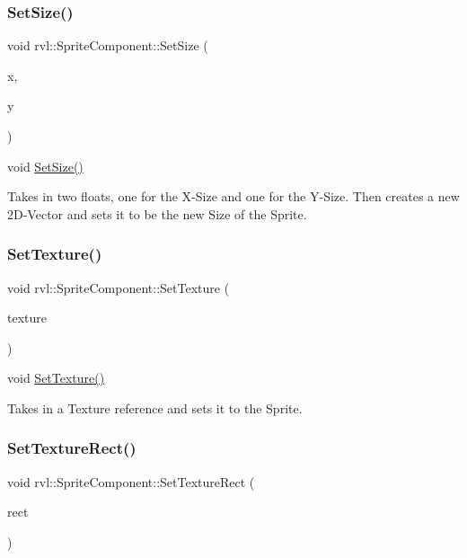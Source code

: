 \subsubsection{\texorpdfstring{Set\+Size()}{SetSize()}}
{\footnotesize\ttfamily void rvl\+::\+Sprite\+Component\+::\+Set\+Size (\begin{DoxyParamCaption}\item[{float}]{x,  }\item[{float}]{y }\end{DoxyParamCaption})}



void \hyperlink{classrvl_1_1_sprite_component_a615e08757168a43c867145c2021949b6}{Set\+Size()} 

Takes in two floats, one for the X-\/\+Size and one for the Y-\/\+Size. Then creates a new 2\+D-\/\+Vector and sets it to be the new Size of the Sprite. \mbox{\label{classrvl_1_1_sprite_component_aa035e9f7abf6d522ca44e115d0887a5c}} 
\subsubsection{\texorpdfstring{Set\+Texture()}{SetTexture()}}
{\footnotesize\ttfamily void rvl\+::\+Sprite\+Component\+::\+Set\+Texture (\begin{DoxyParamCaption}\item[{const sf\+::\+Texture \&}]{texture }\end{DoxyParamCaption})}



void \hyperlink{classrvl_1_1_sprite_component_aa035e9f7abf6d522ca44e115d0887a5c}{Set\+Texture()} 

Takes in a Texture reference and sets it to the Sprite. \mbox{\label{classrvl_1_1_sprite_component_a5d87c00cacc2ed7db9d69cdb15c02505}} 
\subsubsection{\texorpdfstring{Set\+Texture\+Rect()}{SetTextureRect()}}
{\footnotesize\ttfamily void rvl\+::\+Sprite\+Component\+::\+Set\+Texture\+Rect (\begin{DoxyParamCaption}\item[{const sf\+::\+Int\+Rect \&}]{rect }\end{DoxyParamCaption})}




